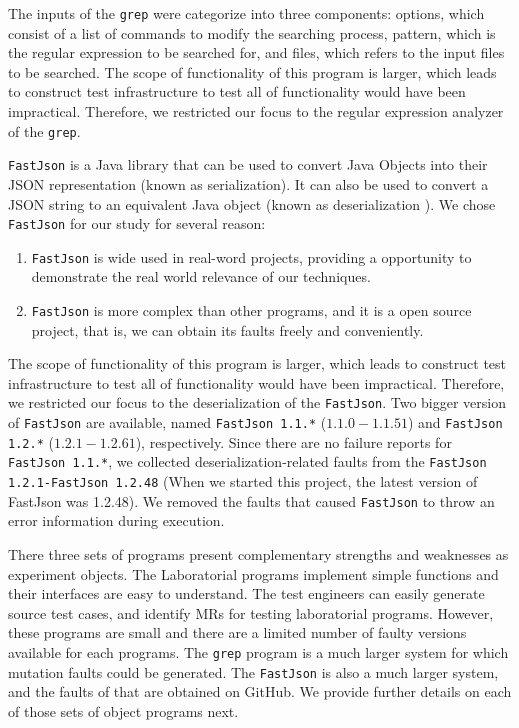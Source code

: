 \documentclass[10pt,journal,compsoc]{IEEEtran}
\begin{document}
The inputs of the \texttt{grep} were categorize into three components: options, which consist of a list of commands to modify the searching process, pattern, which is the regular expression to be searched for, and files, which refers to the input files to be searched. The scope of functionality of this program is larger, which leads to construct test infrastructure to test all of functionality would have been impractical. Therefore, we restricted our focus to the regular expression analyzer of the \texttt{grep}.

\texttt{FastJson} is a Java library that can be used to convert Java Objects into their JSON representation (known as serialization). It can also be used to convert a JSON string to an equivalent Java object (known as deserialization
). We chose \texttt{FastJson} for our study for several reason:

\begin{enumerate}[1]
  \item
  \texttt{FastJson} is wide used in real-word projects, providing a opportunity to demonstrate the real world relevance of our techniques.
  \item
  \texttt{FastJson} is more complex than other programs, and it is a open source project, that is, we can obtain its faults freely and conveniently.
\end{enumerate}

The scope of functionality of this program is larger, which leads to construct test infrastructure to test all of functionality would have been impractical. Therefore, we restricted our focus to the deserialization of the \texttt{FastJson}. Two bigger version of \texttt{FastJson} are available, named \texttt{FastJson 1.1.*} ($1.1.0-1.1.51$) and \texttt{FastJson 1.2.*} ($1.2.1-1.2.61$), respectively. Since there are no failure reports for \texttt{FastJson 1.1.*}, we collected deserialization-related faults from the \texttt{FastJson 1.2.1-FastJson 1.2.48} (When we started this project, the latest version of FastJson was 1.2.48). We removed the faults that caused \texttt{FastJson} to throw an error information during execution.

There three sets of programs present complementary strengths and weaknesses as experiment objects. The Laboratorial programs implement simple functions and their interfaces are easy to understand. The test engineers can easily generate source test cases, and identify MRs for testing laboratorial programs. However, these programs are small and there are a limited number of faulty versions available for each programs. The \texttt{grep} program is a much larger system for which mutation faults could be generated. The \texttt{FastJson} is also a much larger system, and the faults of that are obtained on GitHub.
We provide further details on each of those sets of object programs next.
\end{document}
